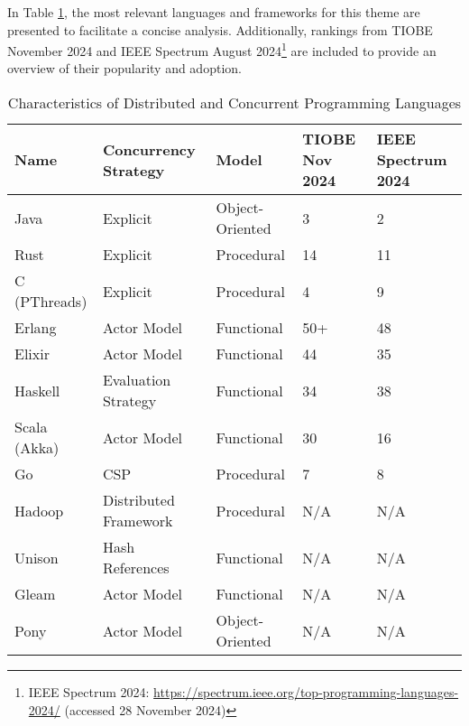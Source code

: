 In Table \ref{tab:languages_comparison}, the most relevant languages and frameworks for this theme are presented to facilitate a concise analysis. Additionally, rankings from TIOBE November 2024 and IEEE Spectrum August 2024\footnote{IEEE Spectrum 2024: \url{https://spectrum.ieee.org/top-programming-languages-2024/} (accessed 28 November 2024)} are included to provide an overview of their popularity and adoption.

\begin{table}[h!]
    \centering
    \hspace*{-0.2cm}
    \begin{tabular}{|l|p{4cm}|p{3cm}|p{2cm}|p{2cm}|}
      \hline
      \textbf{Name} & \textbf{Concurrency Strategy} & \textbf{Model}  & \textbf{TIOBE Nov 2024} & \textbf{IEEE Spectrum 2024} \\ \hline
      Java          & Explicit                      & Object-Oriented & 3                       & 2                           \\ \hline
      Rust          & Explicit                      & Procedural       & 14                      & 11                          \\ \hline
      C (PThreads)  & Explicit                      & Procedural       & 4                       & 9                           \\ \hline
      Erlang        & Actor Model                   & Functional       & 50+                     & 48                          \\ \hline
      Elixir        & Actor Model                   & Functional       & 44                      & 35                          \\ \hline
      Haskell       & Evaluation Strategy           & Functional       & 34                      & 38                          \\ \hline
      Scala (Akka)  & Actor Model                   & Functional       & 30                      & 16                          \\ \hline
      Go            & CSP                           & Procedural       & 7                       & 8                           \\ \hline
      Hadoop        & Distributed Framework         & Procedural       & N/A                     & N/A                         \\ \hline
      Unison        & Hash References               & Functional       & N/A                     & N/A                         \\ \hline
      Gleam         & Actor Model                   & Functional       & N/A                     & N/A                         \\ \hline
      Pony          & Actor Model                   & Object-Oriented  & N/A                     & N/A                         \\ \hline
    \end{tabular}
    \caption{Characteristics of Distributed and Concurrent Programming Languages}
    \label{tab:languages_comparison}
\end{table}

